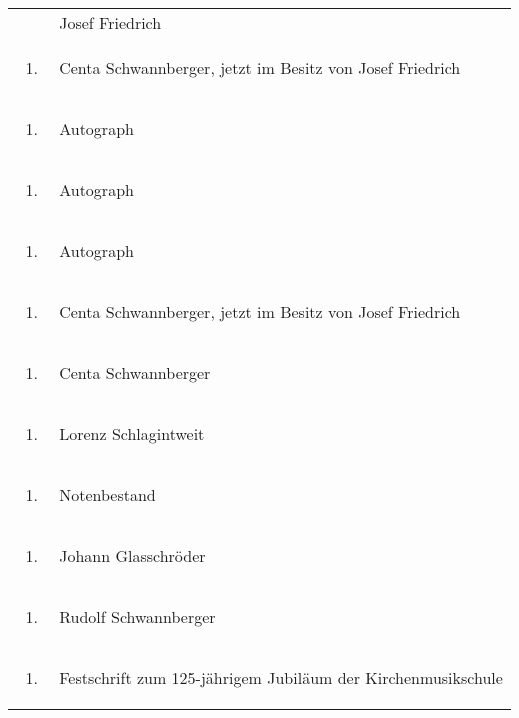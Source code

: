 \documentclass[a4paper]{article}
\begin{document}
\begin{flushleft}
\begin{supertabular}{m{1.2409999cm}m{14.604cm}}
\begin{enumerate}
\end{enumerate}
 &
Josef Friedrich\\
\begin{enumerate}
\item 
\end{enumerate}
 &
Centa Schwannberger, jetzt im Besitz von Josef Friedrich\\
\begin{enumerate}
\item 
\end{enumerate}
 &
Autograph\\
\begin{enumerate}
\item 
\end{enumerate}
 &
Autograph\\
\begin{enumerate}
\item 
\end{enumerate}
 &
Autograph\\
\begin{enumerate}
\item 
\end{enumerate}
 &
Centa Schwannberger, jetzt im Besitz von Josef Friedrich\\
\begin{enumerate}
\item 
\end{enumerate}
 &
Centa Schwannberger\\
\begin{enumerate}
\item 
\end{enumerate}
 &
Lorenz Schlagintweit\\
\begin{enumerate}
\item 
\end{enumerate}
 &
Notenbestand\\
\begin{enumerate}
\item 
\end{enumerate}
 &
Johann Glasschröder\\
\begin{enumerate}
\item 
\end{enumerate}
 &
Rudolf Schwannberger\\
\begin{enumerate}
\item 
\end{enumerate}
 &
Festschrift zum 125-jährigem Jubiläum der Kirchenmusikschule

\end{supertabular}
\end{flushleft}
\end{document}
